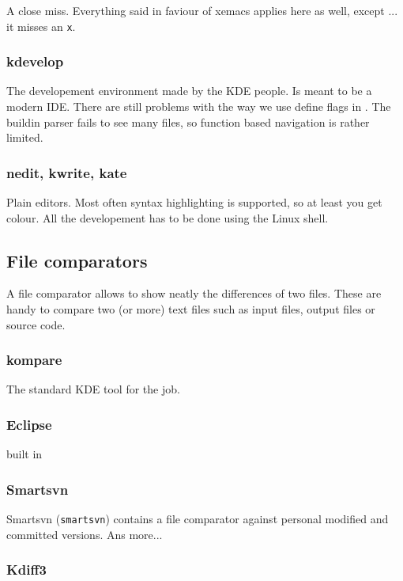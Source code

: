 A close miss. Everything said in faviour of xemacs applies here as
well, except ... it misses an \texttt{x}.


\subsubsection{kdevelop}

The developement environment made by the KDE people. Is meant to be
a modern IDE. There are still problems with the way we use define
flags in \ccarat{}. The buildin parser fails to see many files, so
function based navigation is rather limited.


\subsubsection{nedit, kwrite, kate}

Plain editors. Most often syntax highlighting is supported, so at
least you get colour. All the developement has to be done using the
Linux shell.


\subsection{File comparators}

A file comparator allows to show neatly the differences of two files. These
are handy to compare two (or more) text files such as input files, output
files or source code.

\subsubsection{kompare}

The standard KDE tool for the job.

\subsubsection{Eclipse}

built in

\subsubsection{Smartsvn}

Smartsvn (\texttt{smartsvn}) contains a file comparator against personal
modified and committed versions. Ans more...

\subsubsection{Kdiff3}

